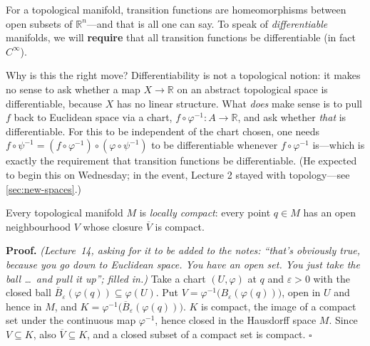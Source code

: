 \documentclass[11pt]{report}
\makeatletter
\newcounter{thmcounter}[section]
\renewenvironment{proof}[1][Proof]{\noindent\textbf{#1.} }{\hfill$\square$\par\vspace{5pt}}
\newcommand{\thmlabel}[1]{\edef\@currentlabel{\arabic{section}.\arabic{thmcounter}}\label{#1}}
\newcommand{\leeref}[1]{\par\smallskip{\raggedleft\footnotesize\textsc{Lee}:\ #1\par}}
\makeatother
\begin{document}
\begin{rembox}\label{rem:preview-what-makes-manifold-differentiable}
For a topological manifold, transition functions are homeomorphisms between open subsets of $\mathbb{R}^n$---and that is all one can say. To speak of \emph{differentiable} manifolds, we will \textbf{require} that all transition functions be differentiable (in fact $C^\infty$).

Why is this the right move? Differentiability is not a topological notion: it makes no sense to ask whether a map $X \to \mathbb{R}$ on an abstract topological space is differentiable, because $X$ has no linear structure. What \emph{does} make sense is to pull $f$ back to Euclidean space via a chart, $f \circ \varphi^{-1} : A \to \mathbb{R}$, and ask whether \emph{that} is differentiable. For this to be independent of the chart chosen, one needs $f \circ \psi^{-1} = (f \circ \varphi^{-1}) \circ (\varphi \circ \psi^{-1})$ to be differentiable whenever $f \circ \varphi^{-1}$ is---which is exactly the requirement that transition functions be differentiable. (He expected to begin this on Wednesday; in the event, Lecture 2 stayed with topology---see \ref{sec:new-spaces}.)
\end{rembox}

\begin{propbox}\thmlabel{prop:locally-compact}
Every topological manifold $M$ is \emph{locally compact}: every point $q \in M$ has an open neighbourhood $V$ whose closure $\overline V$ is compact.
\leeref{Proposition 1.12}
\end{propbox}

\begin{proof}
\textit{(Lecture~14, asking for it to be added to the notes: ``that's obviously true, because you go down to Euclidean space. You have an open set. You just take the ball \ldots\ and pull it up''; filled in.)} Take a chart $(U, \varphi)$ at $q$ and $\varepsilon > 0$ with the closed ball $\overline{B}_\varepsilon(\varphi(q)) \subseteq \varphi(U)$. Put $V = \varphi^{-1}\big(B_\varepsilon(\varphi(q))\big)$, open in $U$ and hence in $M$, and $K = \varphi^{-1}\big(\overline{B}_\varepsilon(\varphi(q))\big)$. $K$ is compact, the image of a compact set under the continuous map $\varphi^{-1}$, hence closed in the Hausdorff space $M$. Since $V \subseteq K$, also $\overline V \subseteq K$, and a closed subset of a compact set is compact.
\end{proof}
\end{document}
